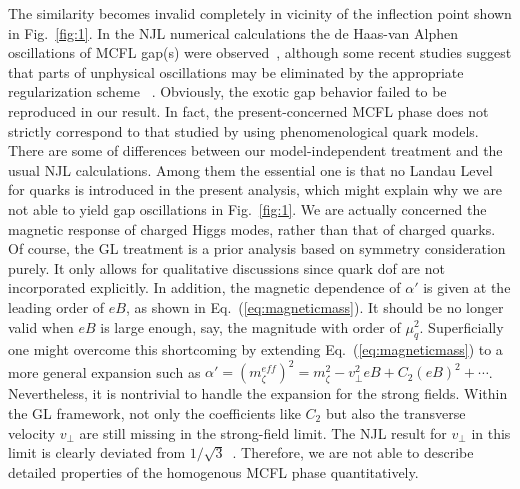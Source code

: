 The similarity becomes invalid completely in vicinity of the inflection point shown in Fig.~\ref{fig:1}. 
In the NJL numerical calculations the de Haas-van Alphen oscillations of MCFL gap(s) were
observed~\cite{ferrer2005magnetic,fukushima2008color}, although some recent studies suggest that parts of
unphysical oscillations may be eliminated by the appropriate regularization scheme ~\cite{allen2015magnetized}.
Obviously, the exotic gap behavior failed to be reproduced in our result. 
In fact, the present-concerned MCFL phase does not strictly correspond to that studied by using phenomenological quark models. There are some of differences between our model-independent treatment and the usual
NJL calculations.
Among them the essential one is that no Landau Level for quarks is introduced in the present analysis, which might explain why we are not able to yield gap oscillations in Fig.~\ref{fig:1}. 
We are actually concerned the magnetic response of charged Higgs modes, rather than that of charged quarks. 
Of course, the GL treatment is a prior analysis based on symmetry consideration purely. It only allows for qualitative discussions since quark dof are not incorporated explicitly. 
In addition, the magnetic dependence of $\alpha'$ is given at the leading order of $eB$, as shown in Eq.~(\ref{eq:magneticmass}). 
It should be no longer valid when $eB$ is large enough, say, the magnitude with order of $\mu_q^2$.
Superficially one might overcome this shortcoming by extending Eq.~(\ref{eq:magneticmass}) to a more general expansion such as $\alpha'=(m_\zeta^{eff})^2 = m_\zeta^2 - v_\perp^2eB + C_2 (eB)^2 + \cdots$. Nevertheless, it is nontrivial to handle the expansion for the strong fields.  
Within the GL framework, not only the coefficients like $C_2$ but also the transverse velocity $v_\perp$ are still missing in the strong-field limit. The NJL result for $v_\perp$ in this limit is clearly deviated from $1/\sqrt{3}$~\cite{sen2015anisotropic}.
Therefore, we are not able to describe detailed properties of the homogenous MCFL phase quantitatively.

